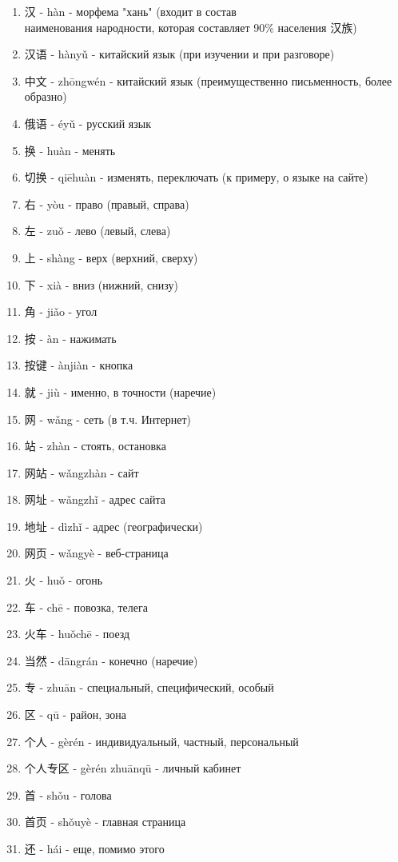 \begin{newwords}\hfill
	\begin{enumerate}
		\item 汉 - hàn - морфема "хань" (входит в состав\\ наименования народности, которая составляет 90\% населения 汉族)
		\item 汉语 - hànyǔ - китайский язык (при изучении и при разговоре)
		\item 中文 - zhōngwén - китайский язык (преимущественно письменность, более образно)
		\item 俄语 - éyǔ - русский язык
		\item 换 - huàn - менять
		\item 切换 - qiēhuàn - изменять, переключать (к примеру, о языке на сайте)
		\item 右 - yòu - право (правый, справа)
		\item 左 - zuǒ - лево (левый, слева)
		\item 上 - shàng - верх (верхний, сверху)
		\item 下 - xià - вниз (нижний, снизу)
		\item 角 - jiǎo - угол
		\item 按 - àn - нажимать
		\item 按键 - ànjiàn - кнопка
		\item 就 - jiù - именно, в точности (наречие)
		\item 网 - wǎng - сеть (в т.ч. Интернет)
		\item 站 - zhàn - стоять, остановка
		\item 网站 - wǎngzhàn - сайт
		\item 网址 - wǎngzhǐ - адрес сайта 
		\item 地址 - dìzhǐ - адрес (географически)
		\item 网页 - wǎngyè - веб-страница
		\item 火 - huǒ - огонь
		\item 车 - chē - повозка, телега
		\item 火车 - huǒchē - поезд
		\item 当然 - dāngrán - конечно (наречие)
		\item 专 - zhuān - специальный, специфический, особый
		\item 区 - qū - район, зона
		\item 个人 - gèrén - индивидуальный, частный, персональный
		\item 个人专区 - gèrén zhuānqū - личный кабинет
		\item 首 - shǒu - голова
		\item 首页 - shǒuyè - главная страница
		\item 还 - hái - еще, помимо этого\\
	\end{enumerate}
\end{newwords}

